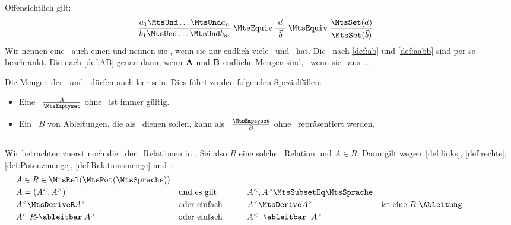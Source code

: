 Offensichtlich gilt:
\begin{align}
	& \frac{a_1 \MtsUnd \dots \MtsUnd a_n}{b_1 \MtsUnd \dots \MtsUnd b_m} \; \MtsEquiv \; \frac{\; \vec{a} \;}{\; \vec{b} \;} \; \MtsEquiv \; \frac{\MtsSet(\vec{a})}{\MtsSet(\vec{b})} \label{eq:AB}
\end{align}
Wir nennen eine \Schlussregel\ auch einen  und nennen sie , wenn sie nur endlich viele \Praemissen\ und \Konklusionen\ hat.
Die \Schlussregeln\ nach \eqref{def:ab} und \eqref{def:aabb} sind per se beschränkt.
Die nach \eqref{def:AB} genau dann, wenn $\mathbf{A}$ und $\mathbf{B}$ endliche Mengen sind, \textdh\ wenn sie \Elemente\ aus ...%

Die Mengen der \Praemissen\ und \Konklusionen\ dürfen auch leer sein.
Dies führt zu den folgenden Spezialfällen:
\begin{itemize}
	\item[] Eine \Schlussregel\ $\frac{A}{\MtsEmptyset}$ ohne \Konklusionen\ ist immer gültig.
	\item[] Ein \Menge\ $B$ von Ableitungen, die als \Axiome\ dienen sollen, kann als \Schlussregel\ $\frac{\MtsEmptyset}{B}$ ohne \Praemissen\ repräsentiert werden.
\end{itemize}

\subsection[Schlussregeln]{\Schlussregeln}%
\label {sub:Schlussregeln}

Wir betrachten zuerst noch die \Menge\ der \binaeren\ Relationen in \MtsPotSprache.
Sei also $R$ eine solche \binaere\ Relation und $A \in R$.
Dann gilt wegen~\eqref{def:links}, \eqref{def:rechts}, \eqref{def:Potenzmenge}, \eqref{def:Relationsmenge} und~:
\begin{align}
	&  A \in R \in \MtsRelAllDerive   \\
	&  A = (\links{A},\rechts{A})
	&& \text{und es gilt}
	&& \links{A}, \rechts{A} \MtsSubsetEq \MtsSprache \\
	&  \links{A} \MtsDeriveR \rechts{A}
	&& \text{oder einfach}
	&& \links{A} \MtsDerive  \rechts{A}
	&& \text{ist eine $R$-\Ableitung}                  \\
	&  \links{A} \; \text{$R$-\ableitbar} \; \rechts{A}
	&& \text{oder einfach} \qquad
	&& \links{A} \;\; \text{\ableitbar} \;\; \rechts{A}
	\formulatoleft
\end{align}

